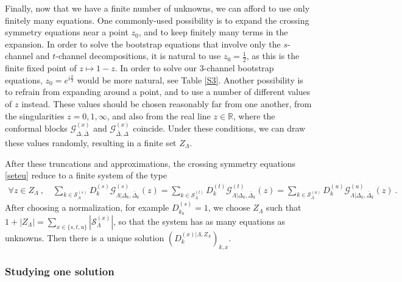 \documentclass[12pt, a4paper]{article}
\begin{document}
Finally, now that we have a finite number of unknowns, we can afford to use only finitely many equations. One commonly-used possibility is to expand the crossing symmetry equations near a point $z_0$, and to keep finitely many terms in the expansion. In order to solve the bootstrap equations that involve only the $s$-channel and $t$-channel decompositions, it is natural to use $z_0=\frac12$, as this is the finite fixed point of $z\mapsto 1-z$. In order to solve our 3-channel bootstrap equations, $z_0 = e^{i\frac{\pi}{3}}$ would be more natural, see Table \eqref{S3}. Another possibility is to refrain from expanding around a point, and to use a number of different values of $z$ instead. These values should be chosen reasonably far from one another, from the singularities $z=0,1,\infty$, and also from the real line $z\in\mathbb{R}$, where the conformal blocks $\mathcal{G}^{(x)}_{\Delta,\bar\Delta}$ and $\mathcal{G}^{(x)}_{\bar\Delta,\Delta}$ coincide. Under these conditions, we can draw these values randomly, resulting in a finite set $Z_\Lambda$.

After these truncations and approximations, the crossing symmetry equations \eqref{seteu} reduce to a finite system of the type 
\begin{align}
 \forall z\in Z_\Lambda\ , \quad 
 \sum_{k\in\mathcal{S}^{(s)}_\Lambda} D_k^{(s)} \mathcal{G}^{(s)}_{\Lambda|\Delta_k,\bar\Delta_k}(z) 
 = \sum_{k\in\mathcal{S}^{(t)}_\Lambda} D_k^{(t)} \mathcal{G}^{(t)}_{\Lambda|\Delta_k,\bar\Delta_k}(z) 
 = \sum_{k\in\mathcal{S}^{(u)}_\Lambda} D_k^{(u)} \mathcal{G}^{(u)}_{\Lambda|\Delta_k,\bar\Delta_k}(z)\ .
 \label{fziz}
\end{align}
After choosing a normalization, for example $D_{k_0}^{(s)}=1$, we choose $Z_\Lambda$ such that $1+|Z_\Lambda|=\sum_{x\in\{s,t,u\}}\left|\mathcal{S}^{(x)}_\Lambda\right|$, so that the system has as many equations as unknowns. Then there is a unique solution $\left(D_k^{(x)|\Lambda,Z_\Lambda}\right)_{k,x}$.

\subsubsection{Studying one solution}\label{sec:sos}
\end{document}
